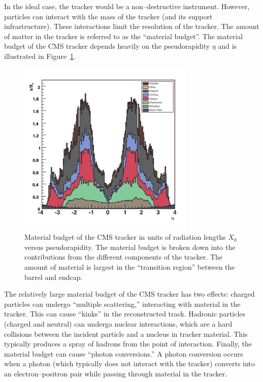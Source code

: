 In the ideal case, the tracker would be a non--destructive instrument.  However,
particles can interact with the mass of the tracker (and its support
infrastructure).  These interactions limit the resolution of the tracker.  The
amount of matter in the tracker is referred to as the ``material budget''.  The
material budget of the CMS tracker depends heavily on the pseudorapidity $\eta$
and is illustrated in Figure~\ref{fig:TrackerMaterialBudget}.
\begin{figure}
  \centering
  \includegraphics[width=0.75\textwidth,viewport=0 12 180 180]{detector_chapter/figures/tracker_material_budget_cleaned.pdf}
  \caption[Material budget of the CMS tracker]{Material budget of the CMS
  tracker in units of radiation lengths $X_0$ versus pseudorapidity.  The
  material budget is broken down into the contributions from the different
  components of the tracker.  The amount of material is largest in the
  ``transition region'' between the barrel and endcap.  }
  \label{fig:TrackerMaterialBudget}
\end{figure}
The relatively large material budget of the CMS tracker has two effects: charged
particles can undergo ``multiple scattering,'' interacting with material in the
tracker.  This can cause ``kinks'' in the reconstructed track.   Hadronic
particles (charged and neutral) can undergo nuclear interactions, which are a
hard collisions between the incident particle and a nucleus in tracker material.
This typically produces a spray of hadrons from the point of interaction.
Finally, the material budget can cause ``photon conversions.''  A photon
conversion occurs when a photon (which typically does not interact with the
tracker) converts into an electron--positron pair while passing through material
in the tracker.  

